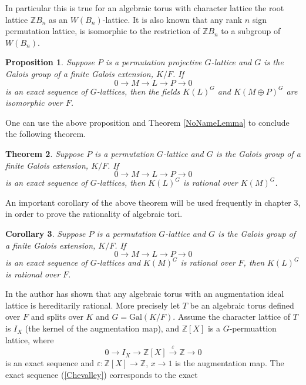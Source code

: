 \documentclass{article}
\theoremstyle{plain}
\newtheorem{theorem}{Theorem}
\newtheorem{corollary}[theorem]{Corollary}
\newtheorem{proposition}[theorem]{Proposition}
\theoremstyle{definition}
\newcommand{\Z}{\ensuremath{\mathbb{Z}}}
\begin{document}
In particular this is true for an algebraic torus with character lattice the root 
lattice $\Z B_n$ as an $W(B_n)$-lattice. It is also known that any rank $n$ sign 
permutation lattice, is isomorphic to the restriction of $\Z B_n$ to a subgroup 
of $W(B_n)$. 
\begin{proposition}\cite[Proposition 1.5]{Lenstra}
Suppose $P$ is a permutation projective $G$-lattice and $G$ is the Galois group 
of a finite Galois extension, $K/F$. If 
$$0 \longrightarrow M \longrightarrow L \longrightarrow P \longrightarrow 0 $$ is 
an exact sequence of $G$-lattices, then the fields $K(L)^G$ and $K(M \oplus P)^G$ are isomorphic over $F$. 
\end{proposition}
\noindent
One can use the above proposition and Theorem \ref{NoNameLemma} to conclude the 
following theorem.
\begin{theorem}\cite[Proposition 1.6]{Lenstra}\label{method2}
Suppose $P$ is a permutation $G$-lattice and $G$ is the Galois group of a finite 
Galois extension, $K/F$.  If 
$$0 \longrightarrow M \longrightarrow L \longrightarrow P \longrightarrow 0 $$ is 
an exact sequence of $G$-lattices, then $K(L)^G$ is rational over $K(M)^G$.
\end{theorem}
\noindent
An important corollary of the above theorem will be used frequently in chapter 3, 
in order to prove the rationality of algebraic tori.
\begin{corollary}\label{permcoker}
Suppose $P$ is a permutation $G$-lattice and $G$ is the Galois group of a finite 
Galois extension, $K/F$.  If $$0 \longrightarrow M \longrightarrow L \longrightarrow P \longrightarrow 0 $$ 
is an exact sequence of $G$-lattices and $K(M)^G$ is rational over $F$, then $K(L)^G$ is rational over $F$.
\end{corollary}
\noindent
In \cite[Section 2.4.8]{Voskresenskii} the author has shown that any algebraic 
torus with an augmentation ideal lattice is hereditarily rational. More precisely 
let $T$ be an algebraic torus defined over $F$ and splits over $K$ and $G = \mathrm{Gal}(K/F)$. 
Assume the character lattice of $T$ is $I_X$ (the kernel of the augmentation map), 
and $\Z [X]$ is a $G$-permuattion lattice, where 
\begin{equation}\label{Chevalley}
0 \longrightarrow I_X \longrightarrow \Z [X] \overset{\varepsilon} \longrightarrow  \Z \longrightarrow 0
\end{equation}
is an exact sequence and $\varepsilon : \Z [X]  \rightarrow \Z $, $x \rightarrow 1$ 
is the augmentation map. The exact sequence (\ref{Chevalley}) corresponds to the exact 
\end{document}
